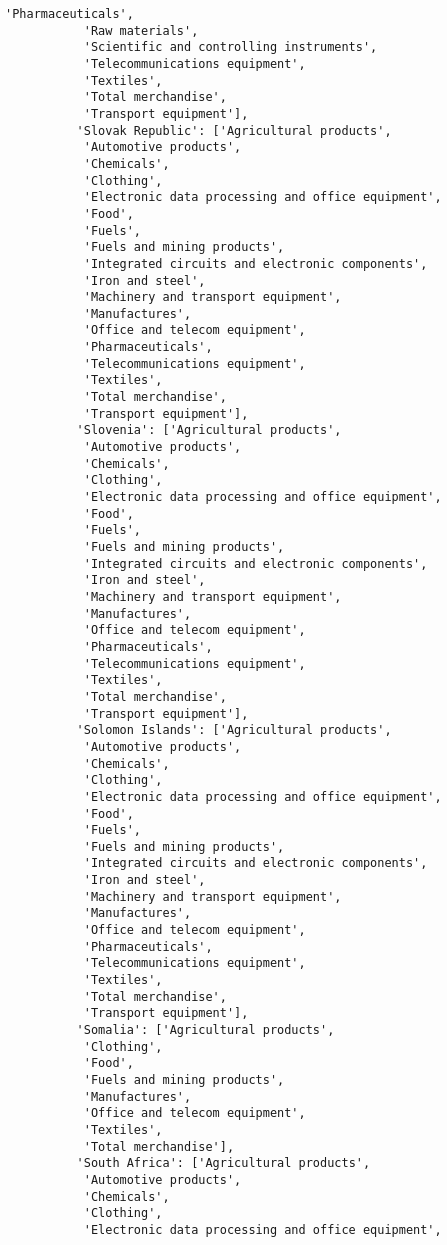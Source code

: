 \documentclass[11pt]{article}
\begin{document}
\begin{Verbatim}[commandchars=\\\{\}]
           'Pharmaceuticals',
           'Raw materials',
           'Scientific and controlling instruments',
           'Telecommunications equipment',
           'Textiles',
           'Total merchandise',
           'Transport equipment'],
          'Slovak Republic': ['Agricultural products',
           'Automotive products',
           'Chemicals',
           'Clothing',
           'Electronic data processing and office equipment',
           'Food',
           'Fuels',
           'Fuels and mining products',
           'Integrated circuits and electronic components',
           'Iron and steel',
           'Machinery and transport equipment',
           'Manufactures',
           'Office and telecom equipment',
           'Pharmaceuticals',
           'Telecommunications equipment',
           'Textiles',
           'Total merchandise',
           'Transport equipment'],
          'Slovenia': ['Agricultural products',
           'Automotive products',
           'Chemicals',
           'Clothing',
           'Electronic data processing and office equipment',
           'Food',
           'Fuels',
           'Fuels and mining products',
           'Integrated circuits and electronic components',
           'Iron and steel',
           'Machinery and transport equipment',
           'Manufactures',
           'Office and telecom equipment',
           'Pharmaceuticals',
           'Telecommunications equipment',
           'Textiles',
           'Total merchandise',
           'Transport equipment'],
          'Solomon Islands': ['Agricultural products',
           'Automotive products',
           'Chemicals',
           'Clothing',
           'Electronic data processing and office equipment',
           'Food',
           'Fuels',
           'Fuels and mining products',
           'Integrated circuits and electronic components',
           'Iron and steel',
           'Machinery and transport equipment',
           'Manufactures',
           'Office and telecom equipment',
           'Pharmaceuticals',
           'Telecommunications equipment',
           'Textiles',
           'Total merchandise',
           'Transport equipment'],
          'Somalia': ['Agricultural products',
           'Clothing',
           'Food',
           'Fuels and mining products',
           'Manufactures',
           'Office and telecom equipment',
           'Textiles',
           'Total merchandise'],
          'South Africa': ['Agricultural products',
           'Automotive products',
           'Chemicals',
           'Clothing',
           'Electronic data processing and office equipment',

\end{Verbatim}
\end{document}

